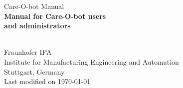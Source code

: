 %
%
\begin{titlepage}
\vspace*{13mm}
\begin{center}
  \vspace{10mm} 
         {\large \hspace{20mm} Care-O-bot Manual\\}
  \vspace{10mm}
       {\Large
          \bf
          \hspace{20mm} Manual for Care-O-bot users\\} 
  \vspace{5mm}
       {\Large
          \bf
          \hspace{20mm} and administrators\\}

  \vspace{80mm}
  \makebox[40mm]{}\\
  \vspace{10mm}
         {\large \hspace{20mm} Fraunhofer IPA} \\
  \vspace{5mm}
         {\large \hspace{20mm} Institute for Manufacturing Engineering and Automation} \\
         {\large \hspace{20mm} Stuttgart, Germany} \\
  \vfill
         {\large \hspace{20mm} Last modified on \today}
\end{center}
\end{titlepage}

\clearpage
\thispagestyle{empty}
\cleardoublepage